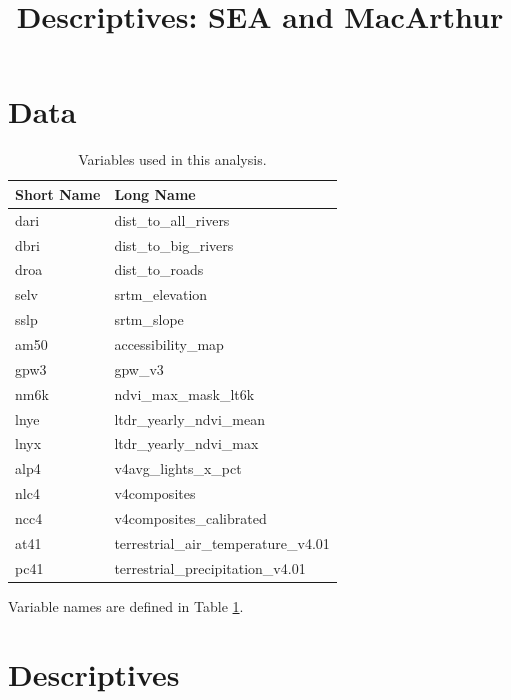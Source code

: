 \documentclass{article}\usepackage[]{graphicx}\usepackage[]{color}
\title{Descriptives: SEA and MacArthur}
\newenvironment{knitrout}{}{}  %
\begin{document}
\begin{knitrout}

\maketitle
\tableofcontents









\newpage
\section{Data}
\begin{table}[ht]
\centering
\begingroup\footnotesize
\begin{tabular}{ll}
  \hline
Short Name & Long Name \\ 
  \hline
dari & dist\_to\_all\_rivers \\ 
  dbri & dist\_to\_big\_rivers \\ 
  droa & dist\_to\_roads \\ 
  selv & srtm\_elevation \\ 
  sslp & srtm\_slope \\ 
  am50 & accessibility\_map \\ 
  gpw3 & gpw\_v3 \\ 
  nm6k & ndvi\_max\_mask\_lt6k \\ 
  lnye & ltdr\_yearly\_ndvi\_mean \\ 
  lnyx & ltdr\_yearly\_ndvi\_max \\ 
  alp4 & v4avg\_lights\_x\_pct \\ 
  nlc4 & v4composites \\ 
  ncc4 & v4composites\_calibrated \\ 
  at41 & terrestrial\_air\_temperature\_v4.01 \\ 
  pc41 & terrestrial\_precipitation\_v4.01 \\ 
   \hline
\end{tabular}
\endgroup
\caption{Variables used in this analysis.} 
\label{Variable_Table}
\end{table}

Variable names are defined in Table \ref{Variable_Table}.  

\newpage

\section{Descriptives}


\end{knitrout}
\end{document}
